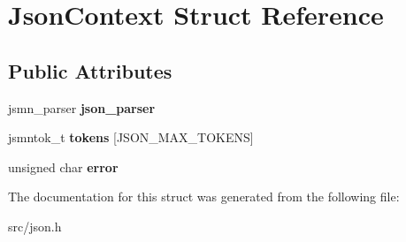 \hypertarget{struct_json_context}{}\section{Json\+Context Struct Reference}
\label{struct_json_context}
\subsection*{Public Attributes}
\begin{DoxyCompactItemize}
\item 
\hypertarget{struct_json_context_a853ea9b1453bf73ee93a2a13e177d99b}{}jsmn\+\_\+parser {\bfseries json\+\_\+parser}\label{struct_json_context_a853ea9b1453bf73ee93a2a13e177d99b}

\item 
\hypertarget{struct_json_context_a4f910b7497f62e2305b58f95de7bfcff}{}jsmntok\+\_\+t {\bfseries tokens} \mbox{[}J\+S\+O\+N\+\_\+\+M\+A\+X\+\_\+\+T\+O\+K\+E\+N\+S\mbox{]}\label{struct_json_context_a4f910b7497f62e2305b58f95de7bfcff}

\item 
\hypertarget{struct_json_context_abbb69d12a125ed96818435be511ee710}{}unsigned char {\bfseries error}\label{struct_json_context_abbb69d12a125ed96818435be511ee710}

\end{DoxyCompactItemize}


The documentation for this struct was generated from the following file\+:\begin{DoxyCompactItemize}
\item 
src/json.\+h\end{DoxyCompactItemize}
